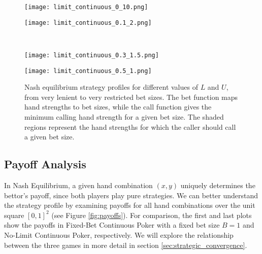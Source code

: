 \documentclass[../../main/main.tex]{subfiles}
\begin{document}
\begin{figure}[h!]
    \begin{adjustwidth}{-1in}{-1in}
        \centering
        \begin{minipage}{0.6\textwidth}
            \centering
            \texttt{[image: limit\_continuous\_0\_10.png]}
        \end{minipage}
        \hspace{0.05\textwidth}
        \begin{minipage}{0.6\textwidth}
            \centering
            \texttt{[image: limit\_continuous\_0.1\_2.png]}
        \end{minipage}
        \vspace{0.5cm}\\
        \begin{minipage}{0.6\textwidth}
            \centering
            \texttt{[image: limit\_continuous\_0.3\_1.5.png]}
        \end{minipage}
        \hspace{0.05\textwidth}
        \begin{minipage}{0.6\textwidth}
            \centering
            \texttt{[image: limit\_continuous\_0.5\_1.png]}
        \end{minipage}
    \end{adjustwidth}
    \caption{Nash equilibrium strategy profiles for different values of $L$ and $U$, from very lenient to very restricted bet sizes. The bet function maps hand strengths to bet sizes, while the call function gives the minimum calling hand strength for a given bet size. The shaded regions represent the hand strengths for which the caller should call a given bet size.}
    \label{fig:strategyprofile}
\end{figure}


\subsection{Payoff Analysis}

In Nash Equilibrium, a given hand combination $(x, y)$ uniquely determines the bettor's payoff, since both players play pure strategies. We can better understand the strategy profile by examining payoffs for all hand combinations over the unit square $[0, 1]^2$ (see Figure \ref{fig:payoffs}). For comparison, the first and last plots show the payoffs in Fixed-Bet Continuous Poker with a fixed bet size $B=1$ and No-Limit Continuous Poker, respectively. We will explore the relationship between the three games in more detail in section \ref{sec:strategic_convergence}.
\end{document}
